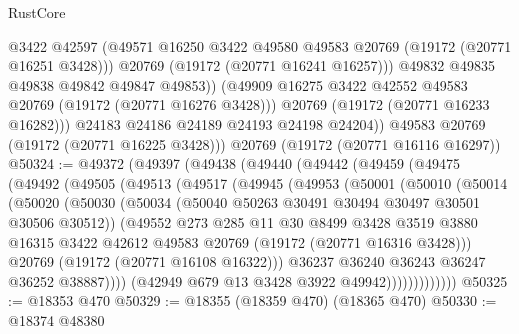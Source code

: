 \begin{lexlean}{RustCore}
\begin{coremodule}
                  @3422
                  @42597
                  (@49571 @16250 @3422 @49580 @49583 @20769 (@19172 (@20771 @16251 @3428)))
                  @20769
                  (@19172 (@20771 @16241 @16257)))
                @49832
                @49835
                @49838
                @49842
                @49847
                @49853))
            (@49909 @16275 @3422 @42552 @49583 @20769 (@19172 (@20771 @16276 @3428)))
            @20769
            (@19172 (@20771 @16233 @16282)))
          @24183
          @24186
          @24189
          @24193
          @24198
          @24204))
      @49583
      @20769
      (@19172 (@20771 @16225 @3428)))
    @20769
    (@19172 (@20771 @16116 @16297))
@50324 := @49372
    (@49397
      (@49438
        (@49440
          (@49442
            (@49459
              (@49475
                (@49492
                  (@49505
                    (@49513
                      (@49517
                        (@49945
                          (@49953
                            (@50001
                              (@50010
                                (@50014
                                  (@50020
                                    (@50030
                                      (@50034
                                        (@50040 @50263 @30491 @30494 @30497 @30501 @30506 @30512))
                                      (@49552
                                        @273
                                        @285
                                        @11
                                        @30
                                        @8499
                                        @3428
                                        @3519
                                        @3880
                                        @16315
                                        @3422
                                        @42612
                                        @49583
                                        @20769
                                        (@19172 (@20771 @16316 @3428)))
                                      @20769
                                      (@19172 (@20771 @16108 @16322)))
                                    @36237
                                    @36240
                                    @36243
                                    @36247
                                    @36252
                                    @38887))))
                            (@42949 @679 @13 @3428 @3922 @49942)))))))))))))
@50325 := @18353 @470
@50329 := @18355 (@18359 @470) (@18365 @470)
@50330 := @18374 @48380

\end{coremodule}
\end{lexlean}
